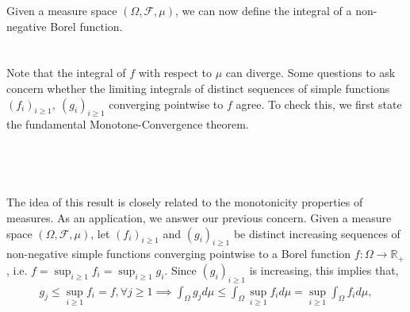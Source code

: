 \documentclass{article}
\begin{document}
Given a measure space $(\Omega, \mathcal{F},\mu)$, we can now define the integral of a non-negative Borel function.\\\\
\noindent{}\\
Note that the integral of $f$ with respect to $\mu$ can diverge. Some questions to ask concern whether the limiting integrals of distinct sequences of simple functions $(f_i)_{i\geq1}, \ (g_i)_{i\geq1}$ converging pointwise to $f$ agree. To check this, we first state the fundamental Monotone-Convergence theorem.\\\\
\noindent{}\\\\\\
The idea of this result is closely related to the monotonicity properties of measures. As an application, we answer our previous concern. Given a measure space $(\Omega,\mathcal{F},\mu)$, let $(f_i)_{i\geq1}$ and $(g_i)_{i\geq1}$ be distinct increasing sequences of non-negative simple functions converging pointwise to a Borel function $f:\Omega\to\mathbb{R}_+$, i.e. $f = \sup_{i\geq1}f_i = \sup_{i\geq1}g_i$. Since $(g_i)_{i\geq1}$ is increasing, this implies that,
\begin{eqnarray}
	\nonumber
	g_j \leq \sup_{i \geq 1}f_i = f, \forall j \geq 1 \implies \int_\Omega g_j d\mu \leq \int_\Omega \sup_{i \geq 1}f_i d\mu = \sup_{i \geq 1} \int_\Omega f_i d\mu,
\end{eqnarray}
\end{document}
